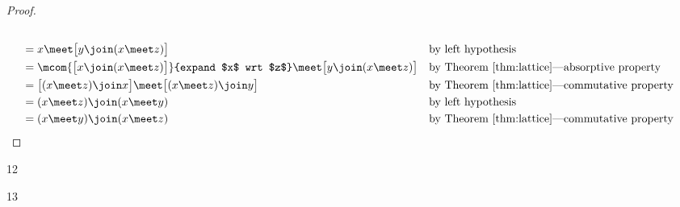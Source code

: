 \begin{proof}
\begin{align*}
  \\&= x \meet \big[ y\join(x \meet z) \big]
    && \text{by left hypothesis}
  \\&= \mcom{\big[ x \join (x \meet z)\big]}{expand $x$ wrt $z$}  
       \meet \big[ y\join(x \meet z) \big]
    && \text{by Theorem~\ref{thm:lattice}---absorptive property}
  \\&= \big[ (x \meet z) \join x\big] \meet \big[ (x \meet z) \join y\big]
    && \text{by Theorem~\ref{thm:lattice}---commutative property}
  \\&= (x \meet z) \join (x \meet y)
    && \text{by left hypothesis}
  \\&= (x \meet y) \join (x \meet z)
    && \text{by Theorem~\ref{thm:lattice}---commutative property}
\end{align*}
\end{proof}

\begin{definition}
\label{def:lat_dis}
\citep{burris}{12}
\end{definition}


\begin{definition}
\label{def:lat_mod}
\citep{burris}{13}
\end{definition}


